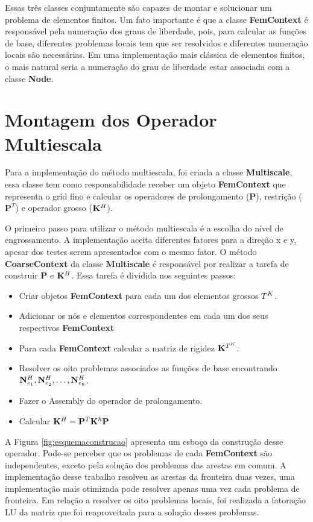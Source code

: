 Essas três classes conjuntamente são capazes de montar e solucionar um problema de elementos finitos. Um fato importante é que a classe \textbf{FemContext} é responsável pela numeração dos graus de liberdade, pois, para calcular as funções de base, diferentes problemas locais tem que ser resolvidos e diferentes numeração locais são necessárias. Em uma implementação mais clássica de elementos finitos, o mais natural seria a numeração do grau de liberdade estar associada com a classe \textbf{Node}.


\section{Montagem dos Operador Multiescala}

Para a implementação do método multiescala, foi criada a classe \textbf{Multiscale}, essa classe tem como responsabilidade receber um objeto \textbf{FemContext} que representa o grid fino e calcular os operadores de prolongamento ($\mathbf{P}$), restrição ($\mathbf{P}^T$) e operador grosso ($\rigidmatrixcoarse$).


O primeiro passo para utilizar o método multiescala é a escolha do nível de engrossamento. A implementação aceita diferentes fatores para a direção x e y, apesar dos testes serem apresentados com o mesmo fator. O método \textbf{CoarseContext} da classe \textbf{Multiscale} é responsável por realizar a tarefa de construir $\mathbf{P}$ e $\rigidmatrixcoarse$. Essa tarefa é dividida nos seguintes passos: 

\begin{itemize}
    \item Criar objetos \textbf{FemContext} para cada um dos elementos grossos $\coarseelement$.
    \item Adicionar os nós e elementos correspondentes em cada um dos seus respectivos \textbf{FemContext}
    \item Para cada \textbf{FemContext} calcular a matriz de rigidez $\rigidmatrixelementms$.
    \item Resolver os oito problemas associados as funções de base encontrando $\basefunctionelemcoarse[1],  \basefunctionelemcoarse[2], \hdots, \basefunctionelemcoarse[8]$.
    \item Fazer o Assembly do operador de prolongamento.
    \item Calcular $\rigidmatrixcoarse = \mathbf{P}^T \rigidmatrix \mathbf{P}$
\end{itemize}

A Figura \ref{fig:esquemaconstrucao} apresenta um esboço da construção desse operador. Pode-se perceber que os problemas de cada \textbf{FemContext} são independentes, exceto pela solução dos problemas das arestas em comum. A implementação desse trabalho resolveu as arestas da fronteira duas vezes, uma implementação mais otimizada pode resolver apenas uma vez cada problema de fronteira. Em relação a resolver os oito problemas locais, foi realizada a fatoração LU da matriz que foi reaproveitada para a solução desses problemas. 

